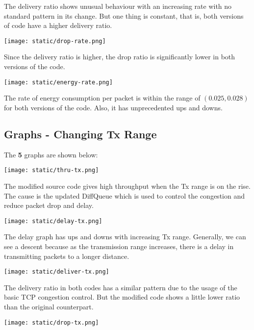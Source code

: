 \documentclass{article}
\begin{document}
The delivery ratio shows unusual behaviour with an increasing rate with no standard pattern in its change. But one thing is constant, that is, both versions of code have a higher delivery ratio.

\begin{center}
    \texttt{[image: static/drop-rate.png]}
\end{center}

Since the delivery ratio is higher, the drop ratio is significantly lower in both versions of the code.

\begin{center}
    \texttt{[image: static/energy-rate.png]}
\end{center}

The rate of energy consumption per packet is within the range of $(0.025, 0.028)$ for both versions of the code. Also, it has unprecedented ups and downs.

\subsection{Graphs - Changing Tx Range}
The \textbf{5} graphs are shown below:

\begin{center}
    \texttt{[image: static/thru-tx.png]}
\end{center}

The modified source code gives high throughput when the Tx range is on the rise. The cause is the updated DiffQueue which is used to control the congestion and reduce packet drop and delay.

\begin{center}
    \texttt{[image: static/delay-tx.png]}
\end{center}

The delay graph has ups and downs with increasing Tx range. Generally, we can see a descent because as the transmission range increases, there is a delay in transmitting packets to a longer distance.

\begin{center}
    \texttt{[image: static/deliver-tx.png]}
\end{center}

The delivery ratio in both codes has a similar pattern due to the usage of the basic TCP congestion control. But the modified code shows a little lower ratio than the original counterpart.

\begin{center}
    \texttt{[image: static/drop-tx.png]}
\end{center}
\end{document}
